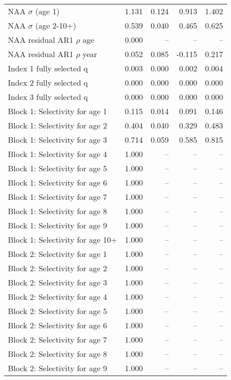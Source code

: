 \documentclass[
]{article}
\begin{document}
\begin{landscape}
\begin{longtable}[t]{lrrrr}
\endfoot
\bottomrule
\endlastfoot
NAA $\sigma$ (age 1) & 1.131 & 0.124 & 0.913 & 1.402\\
NAA $\sigma$ (age 2-10+) & 0.539 & 0.040 & 0.465 & 0.625\\
NAA residual AR1 $\rho$ age & 0.000 & -- & -- & --\\
NAA residual AR1 $\rho$ year & 0.052 & 0.085 & -0.115 & 0.217\\
Index 1 fully selected q & 0.003 & 0.000 & 0.002 & 0.004\\
\addlinespace
Index 2 fully selected q & 0.000 & 0.000 & 0.000 & 0.000\\
Index 3 fully selected q & 0.000 & 0.000 & 0.000 & 0.000\\
Block 1: Selectivity for age 1 & 0.115 & 0.014 & 0.091 & 0.146\\
Block 1: Selectivity for age 2 & 0.404 & 0.040 & 0.329 & 0.483\\
Block 1: Selectivity for age 3 & 0.714 & 0.059 & 0.585 & 0.815\\
\addlinespace
Block 1: Selectivity for age 4 & 1.000 & -- & -- & --\\
Block 1: Selectivity for age 5 & 1.000 & -- & -- & --\\
Block 1: Selectivity for age 6 & 1.000 & -- & -- & --\\
Block 1: Selectivity for age 7 & 1.000 & -- & -- & --\\
Block 1: Selectivity for age 8 & 1.000 & -- & -- & --\\
\addlinespace
Block 1: Selectivity for age 9 & 1.000 & -- & -- & --\\
Block 1: Selectivity for age 10+ & 1.000 & -- & -- & --\\
Block 2: Selectivity for age 1 & 1.000 & -- & -- & --\\
Block 2: Selectivity for age 2 & 1.000 & -- & -- & --\\
Block 2: Selectivity for age 3 & 1.000 & -- & -- & --\\
\addlinespace
Block 2: Selectivity for age 4 & 1.000 & -- & -- & --\\
Block 2: Selectivity for age 5 & 1.000 & -- & -- & --\\
Block 2: Selectivity for age 6 & 1.000 & -- & -- & --\\
Block 2: Selectivity for age 7 & 1.000 & -- & -- & --\\
Block 2: Selectivity for age 8 & 1.000 & -- & -- & --\\
\addlinespace
Block 2: Selectivity for age 9 & 1.000 & -- & -- & --\\

\end{longtable}
\end{landscape}
\end{document}
